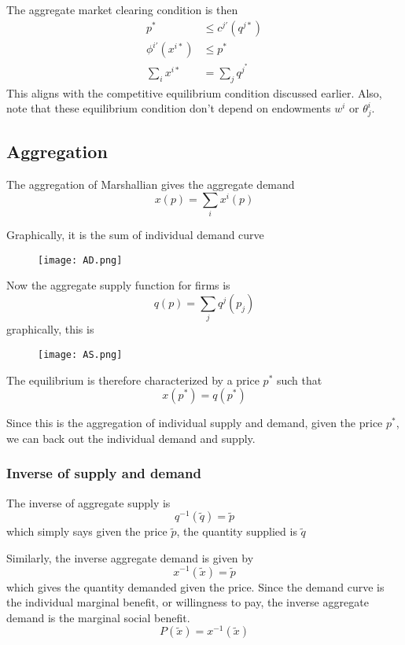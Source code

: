 \documentclass[twocolumn, fleqn]{article}
\begin{document}
		The aggregate market clearing condition is then 
		\begin{align}
			p^\ast &\leq c^{j\prime} (q^{j\ast})\\
			\phi^{i \prime}(x^{i\ast})&\leq p^\ast\\
			\sum_i x^{i \ast} &= \sum_j q^{j^\ast}
		\end{align}
		This aligns with the competitive equilibrium condition discussed earlier. Also, note that these equilibrium condition don't depend on endowments $w^i$ or $\theta_j^i$.
		
		\subsection{Aggregation}
		
		The aggregation of Marshallian gives the aggregate demand
		\[ x(p) = \sum_i x^i(p)\]
		
		Graphically, it is the sum of individual demand curve
		\begin{figure}[h]
			\center
			\texttt{[image: AD.png]}
		\end{figure}
		
		
		Now the aggregate supply function for firms is 
		\[ q(p) = \sum_j q^j(p_j)\]
		graphically, this is 
		\begin{figure}[h]
			\center
			\texttt{[image: AS.png]}
		\end{figure}	
		
		The equilibrium is therefore characterized by a price $p^\ast$ such that 
		\[x(p^\ast) = q(p^\ast)\]
		
		Since this is the aggregation of individual supply and demand, given the price $p^\ast$, we can back out the individual demand and supply.
		
		\subsubsection{Inverse of supply and demand}
		
		The inverse of aggregate supply is 
		\[q^{-1}(\tilde{q})=\tilde{p}\]
		which simply says given the price $\tilde{p}$, the quantity supplied is $\tilde{q}$
		
		Similarly, the inverse aggregate demand is given by 
		\[x^{-1}(\tilde{x})=\tilde{p}\]
		which gives the quantity demanded given the price. 
		Since the demand curve is the individual marginal benefit, or willingness to pay, the inverse aggregate demand is the marginal social benefit.
		\[P(\tilde{x})=x^{-1}(\tilde{x})\]
		
\end{document}
